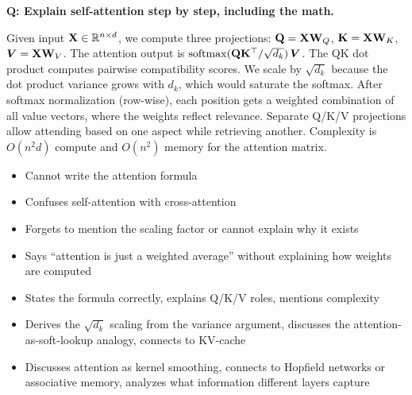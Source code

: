 \begin{interviewq}
\textbf{Q: Explain self-attention step by step, including the math.}

 \quad {} \quad \badgefreq{\freqhigh}

\stronganswer
Given input $\mathbf{X} \in \mathbb{R}^{n \times d}$, we compute three projections:
$\mathbf{Q} = \mathbf{X}\mathbf{W}_Q$, $\mathbf{K} = \mathbf{X}\mathbf{W}_K$, $\bm{V} = \mathbf{X}\mathbf{W}_V$.  The attention output
is $\operatorname{softmax}(\mathbf{Q}\mathbf{K}^\top / \sqrt{d_k})\,\bm{V}$.  The QK dot product computes
pairwise compatibility scores.  We scale by $\sqrt{d_k}$ because the dot
product variance grows with $d_k$, which would saturate the softmax.  After
softmax normalization (row-wise), each position gets a weighted combination of
all value vectors, where the weights reflect relevance.  Separate Q/K/V
projections allow attending based on one aspect while retrieving another.
Complexity is $O(n^2 d)$ compute and $O(n^2)$ memory for the attention matrix.

\redflags
\begin{itemize}
    \item Cannot write the attention formula
    \item Confuses self-attention with cross-attention
    \item Forgets to mention the scaling factor or cannot explain why it exists
    \item Says ``attention is just a weighted average'' without explaining how
          weights are computed
\end{itemize}


\goodgreat
\begin{itemize}
    \item {} States the formula correctly, explains Q/K/V roles,
          mentions complexity
    \item {} Derives the $\sqrt{d_k}$ scaling from the variance
          argument, discusses the attention-as-soft-lookup analogy, connects to
          KV-cache
    \item {} Discusses attention as kernel smoothing, connects to
          Hopfield networks or associative memory, analyzes what information
          different layers capture
\end{itemize}

\end{interviewq}

